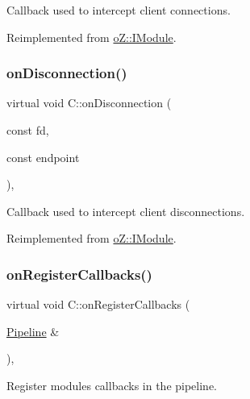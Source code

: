 Callback used to intercept client connections. 



Reimplemented from \mbox{\hyperlink{classo_z_1_1_i_module_a8acf56655f9e59a8a04afd8b0adf79d6}{o\+Z\+::\+I\+Module}}.

\mbox{\label{class_c_ab9bef2875c2d19d674aa592f63a21bc1}} 
\subsubsection{\texorpdfstring{onDisconnection()}{onDisconnection()}}
{\footnotesize\ttfamily virtual void C\+::on\+Disconnection (\begin{DoxyParamCaption}\item[{const}]{fd,  }\item[{const}]{endpoint }\end{DoxyParamCaption})\hspace{0.3cm}{\ttfamily [inline]}, {\ttfamily [virtual]}}



Callback used to intercept client disconnections. 



Reimplemented from \mbox{\hyperlink{classo_z_1_1_i_module_aa178220a4e7ba0cca50a131403e04847}{o\+Z\+::\+I\+Module}}.

\mbox{\label{class_c_ae55c5d0571aadf7e48cae4d1e4fcf591}} 
\subsubsection{\texorpdfstring{onRegisterCallbacks()}{onRegisterCallbacks()}}
{\footnotesize\ttfamily virtual void C\+::on\+Register\+Callbacks (\begin{DoxyParamCaption}\item[{\mbox{\hyperlink{classo_z_1_1_pipeline}{Pipeline}} \&}]{ }\end{DoxyParamCaption})\hspace{0.3cm}{\ttfamily [inline]}, {\ttfamily [virtual]}}



Register module\textquotesingle{}s callbacks in the pipeline. 



